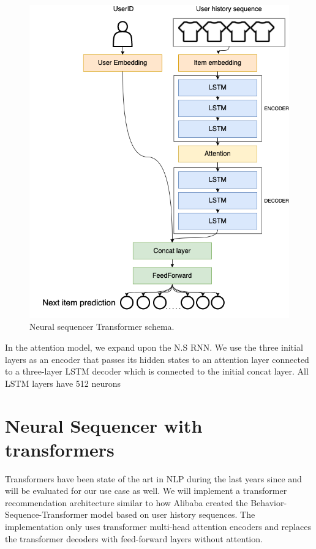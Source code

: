 \documentclass{kththesis}
\begin{document}
\begin{figure}[H]
    \centering
    \includegraphics[scale=0.45]{images/models/Attention.png}
    \caption{Neural sequencer Transformer schema.}
\end{figure}

In the attention model, we expand upon the N.S RNN. We use the three initial layers as an encoder that passes its hidden states to an attention layer connected to a three-layer LSTM decoder which is connected to the initial concat layer. All LSTM layers have 512 neurons

\section{Neural Sequencer with transformers}
Transformers have been state of the art in NLP during the last years since \cite{attentionisallyouneed} and will be evaluated for our use case as well. We will implement a transformer recommendation architecture similar to how Alibaba created the Behavior-Sequence-Transformer model \cite{alibaba} based on user history sequences. The implementation only uses transformer multi-head attention encoders and replaces the transformer decoders with feed-forward layers without attention.
\end{document}
